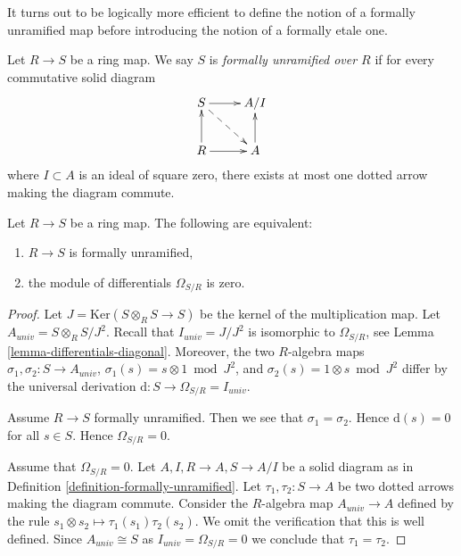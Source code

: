\noindent
It turns out to be logically more efficient to define
the notion of a formally unramified map before introducing
the notion of a formally etale one.

\begin{definition}
\label{definition-formally-unramified}
Let $R \to S$ be a ring map.
We say $S$ is {\it formally unramified over $R$} if for every
commutative solid diagram
$$
\xymatrix{
S \ar[r] \ar@{-->}[rd] & A/I \\
R \ar[r] \ar[u] & A \ar[u]
}
$$
where $I \subset A$ is an ideal of square zero, there exists
at most one dotted arrow making the diagram commute.
\end{definition}

\begin{lemma}
\label{lemma-characterize-formally-unramified}
Let $R \to S$ be a ring map.
The following are equivalent:
\begin{enumerate}
\item $R \to S$ is formally unramified,
\item the module of differentials $\Omega_{S/R}$ is zero.
\end{enumerate}
\end{lemma}

\begin{proof}
Let $J = \text{Ker}(S \otimes_R S \to S)$ be the kernel of
the multiplication map. Let $A_{univ} = S \otimes_R S/J^2$. Recall
that $I_{univ} = J/J^2$ is isomorphic to $\Omega_{S/R}$, see
Lemma \ref{lemma-differentials-diagonal}. Moreover, the two $R$-algebra maps
$\sigma_1, \sigma_2 : S \to A_{univ}$, $\sigma_1(s) = s \otimes 1 \bmod J^2$,
and $\sigma_2(s) = 1 \otimes s \bmod J^2$ differ by the
universal derivation $\text{d} : S \to \Omega_{S/R} = I_{univ}$.

\medskip\noindent
Assume $R \to S$ formally unramified.
Then we see that $\sigma_1 = \sigma_2$.
Hence $\text{d}(s) = 0$ for all $s \in S$.
Hence $\Omega_{S/R} = 0$.

\medskip\noindent
Assume that $\Omega_{S/R} = 0$. Let $A, I, R \to A, S \to A/I$
be a solid diagram as in Definition \ref{definition-formally-unramified}.
Let $\tau_1, \tau_2 : S \to A$ be two dotted arrows making the
diagram commute. Consider the $R$-algebra map $A_{univ} \to A$
defined by the rule $s_1 \otimes s_2 \mapsto \tau_1(s_1)\tau_2(s_2)$.
We omit the verification that this is well defined. Since $A_{univ} \cong S$
as $I_{univ} = \Omega_{S/R} = 0$ we conclude that $\tau_1 = \tau_2$.
\end{proof}
















